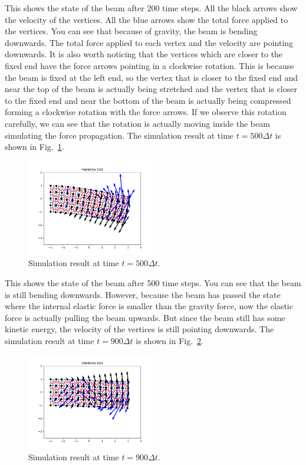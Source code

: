 \documentclass[acmtog]{acmart}
\begin{document}
This shows the state of the beam after 200 time steps. All the black arrows show the velocity of the vertices. All the blue arrows show the total force applied to the vertices. You can see that because of gravity, the beam is bending downwards. The total force applied to each vertex and the velocity are pointing downwards. It is also worth noticing that the vertices which are closer to the fixed end have the force arrows pointing in a clockwise rotation. This is because the beam is fixed at the left end, so the vertex that is closer to the fixed end and near the top of the beam is actually being stretched and the vertex that is closer to the fixed end and near the bottom of the beam is actually being compressed forming a clockwise rotation with the force arrows. If we observe this rotation carefully, we can see that the rotation is actually moving inside the beam simulating the force propagation. The simulation result at time $t=500\Delta t$ is shown in Fig.~\ref{fig:gravity3}.

\begin{figure}[H]
  \centering
  \includegraphics[width=0.5\textwidth]{images/gravity3.png}
  \caption{Simulation result at time $t=500\Delta t$.}
  \label{fig:gravity3}
\end{figure}

This shows the state of the beam after 500 time steps. You can see that the beam is still bending downwards. However, because the beam has passed the state where the internal elastic force is smaller than the gravity force, now the elastic force is actually pulling the beam upwards. But since the beam still has some kinetic energy, the velocity of the vertices is still pointing downwards. The simulation result at time $t=900\Delta t$ is shown in Fig.~\ref{fig:gravity4}.

\begin{figure}[H]
  \centering
  \includegraphics[width=0.5\textwidth]{images/gravity4.png}
  \caption{Simulation result at time $t=900\Delta t$.}
  \label{fig:gravity4}
\end{figure}
\end{document}
